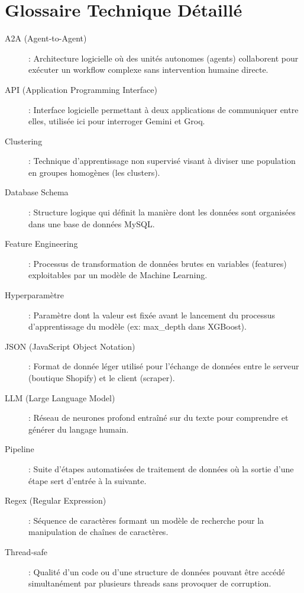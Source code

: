 \documentclass[11pt,a4paper,oneside]{report}
\begin{document}
    \tableofcontents
    \newpage

    \chapter*{Glossaire Technique Détaillé}
    \begin{description}
        \item[A2A (Agent-to-Agent)] : Architecture logicielle où des unités autonomes (agents) collaborent pour exécuter un workflow complexe sans intervention humaine directe.
        \item[API (Application Programming Interface)] : Interface logicielle permettant à deux applications de communiquer entre elles, utilisée ici pour interroger Gemini et Groq.
        \item[Clustering] : Technique d'apprentissage non supervisé visant à diviser une population en groupes homogènes (les clusters).
        \item[Database Schema] : Structure logique qui définit la manière dont les données sont organisées dans une base de données MySQL.
        \item[Feature Engineering] : Processus de transformation de données brutes en variables (features) exploitables par un modèle de Machine Learning.
        \item[Hyperparamètre] : Paramètre dont la valeur est fixée avant le lancement du processus d'apprentissage du modèle (ex: max\_depth dans XGBoost).
        \item[JSON (JavaScript Object Notation)] : Format de donnée léger utilisé pour l'échange de données entre le serveur (boutique Shopify) et le client (scraper).
        \item[LLM (Large Language Model)] : Réseau de neurones profond entraîné sur du texte pour comprendre et générer du langage humain.
        \item[Pipeline] : Suite d'étapes automatisées de traitement de données où la sortie d'une étape sert d'entrée à la suivante.
        \item[Regex (Regular Expression)] : Séquence de caractères formant un modèle de recherche pour la manipulation de chaînes de caractères.
        \item[Thread-safe] : Qualité d'un code ou d'une structure de données pouvant être accédé simultanément par plusieurs threads sans provoquer de corruption.
    \end{description}
\end{document}
